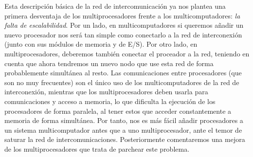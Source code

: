 Esta descripción básica de la red de intercomunicación ya nos plantea una primera desventaja de los multiprocesadores frente a los multicomputadores: \emph{la falta de escalabilidad}. Por un lado, en multicomputadores si queremos añadir un nuevo procesador nos será tan simple como conectarlo a la red de interconexión (junto con sus módulos de memoria y de E/S). Por otro lado, en multiprocesadores, deberemos también conectar el proceador a la red, teniendo en cuenta que ahora tendremos un nuevo nodo que use esta red de forma probablemente simultánea al resto. Las comunicaciones entre procesadores (que son no muy frecuentes) son el único uso de los multicomputadores de la red de interconexión, mientras que los multiprocesadores deben usarla para comunicaciones y acceso a memoria, lo que dificulta la ejecución de los procesadores de forma paralela, al tener estos que acceder constantemente a memoria de forma simultánea. Por tanto, nos es más fácil añadir procesadores a un sistema multicomputador antes que a uno multiprocesador, ante el temor de saturar la red de intercomunicaciones. Posteriormente comentaremos una mejora de los multiprocesadores que trata de parchear este problema.

